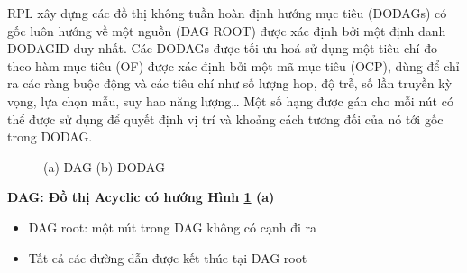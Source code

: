 \documentclass{report}
\begin{document}
RPL xây dựng các đồ thị không tuần hoàn định hướng mục tiêu (DODAGs) có gốc
luôn hướng về một nguồn (DAG ROOT) được xác định bởi một định danh
DODAGID duy nhất. Các DODAGs được tối ưu hoá sử dụng một tiêu chí đo theo
hàm mục tiêu (OF) được xác định bởi một mã mục tiêu (OCP), dùng để chỉ ra các
ràng buộc động và các tiêu chí như số lượng hop, độ trễ, số lần truyền kỳ vọng, lựa
chọn mẫu, suy hao năng lượng… Một số hạng được gán cho mỗi nút có thể được sử
dụng để quyết định vị trí và khoảng cách tương đối của nó tới gốc trong DODAG.\\

\begin{figure}[h]
	\centering
	\caption{(a) DAG (b) DODAG }
	\label{fig:Graph17}
\end{figure}

\textbf{DAG: Đồ thị Acyclic có hướng Hình \ref{fig:Graph17} (a)}
\begin{itemize}
	\item DAG root: một nút trong DAG không có cạnh đi ra
	\item Tất cả các đường dẫn được kết thúc tại DAG root
\end{itemize}
\end{document}
